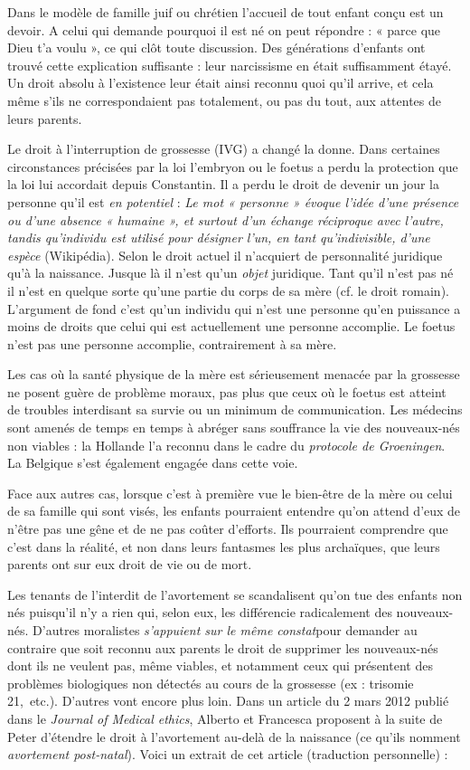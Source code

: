  Dans le modèle de famille juif ou chrétien l'accueil de tout enfant conçu est un devoir. A celui qui demande pourquoi il est né on peut répondre : « parce que Dieu t'a voulu », ce qui clôt toute discussion. Des générations d'enfants ont trouvé cette explication suffisante : leur narcissisme en était suffisamment étayé. Un droit absolu à l'existence leur était ainsi reconnu quoi qu'il arrive, et cela même s'ils ne correspondaient pas totalement, ou pas du tout, aux attentes de leurs parents.
  
 Le droit à l'interruption de grossesse (IVG) a changé la donne. Dans certaines circonstances précisées par la loi l'embryon ou le foetus a perdu la protection que la loi lui accordait depuis Constantin. Il a perdu le droit de devenir un jour la personne qu'il est \emph{en potentiel} : {\emph{Le mot « personne » évoque l'idée d'une présence ou d'une absence « humaine », et surtout d'un échange réciproque avec l'autre, tandis qu'individu est utilisé pour désigner l'un, en tant qu'indivisible, d'une espèce}} (Wikipédia). Selon le droit actuel il n'acquiert de personnalité juridique qu'à la naissance. Jusque là il n'est qu'un \emph{objet} juridique. Tant qu'il n'est pas né il n'est en quelque sorte qu'une partie du corps de sa mère (cf. le droit romain). L'argument de fond c'est qu'un individu qui n'est une personne qu'en puissance a moins de droits que celui qui est actuellement une personne accomplie. Le foetus n'est pas une personne accomplie, contrairement à sa mère. 

 Les cas où la santé physique de la mère est sérieusement menacée par la grossesse ne posent guère de problème moraux, pas plus que ceux où le foetus est atteint de troubles interdisant sa survie ou un minimum de communication. Les médecins sont amenés de temps en temps à abréger sans souffrance la vie des nouveaux-nés non viables : la Hollande l'a reconnu dans le cadre du \emph{protocole de Groeningen}. La Belgique s'est également engagée dans cette voie. 
 
 Face aux autres cas, lorsque c'est à première vue le bien-être de la mère ou celui de sa famille qui sont visés, les enfants pourraient entendre qu'on attend d'eux de n'être pas une gêne et de ne pas coûter d'efforts. Ils pourraient comprendre que c'est dans la réalité, et non dans leurs fantasmes les plus archaïques, que leurs parents ont sur eux droit de vie ou de mort.

 Les tenants de l'interdit de l'avortement se scandalisent qu'on tue des enfants non nés puisqu'il n'y a rien qui, selon eux, les différencie radicalement des nouveaux-nés. D'autres moralistes \emph{s'appuient sur le même constat}pour demander au contraire que soit reconnu aux parents le droit de supprimer les nouveaux-nés dont ils ne veulent pas, même viables, et notamment ceux qui présentent des problèmes biologiques non détectés au cours de la grossesse (ex : trisomie 21,~etc.). D'autres vont encore plus loin. Dans un article du 2 mars 2012 publié dans le \emph{Journal of Medical ethics}, Alberto  et Francesca  proposent à la suite de Peter  d'étendre le droit à l'avortement au-delà de la naissance (ce qu'ils nomment \emph{avortement post-natal}). Voici un extrait de cet article (traduction personnelle) :

